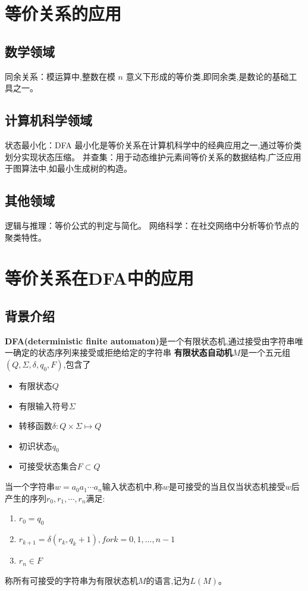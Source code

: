 \documentclass{article}
\begin{document}
\newpage
\section{等价关系的应用}
\subsection{数学领域}
同余关系：模运算中,整数在模 $n$ 意义下形成的等价类,即同余类,是数论的基础工具之一。

\subsection{计算机科学领域}
状态最小化：DFA 最小化是等价关系在计算机科学中的经典应用之一,通过等价类划分实现状态压缩。
并查集：用于动态维护元素间等价关系的数据结构,广泛应用于图算法中,如最小生成树的构造。

\subsection{其他领域}
逻辑与推理：等价公式的判定与简化。
网络科学：在社交网络中分析等价节点的聚类特性。


\newpage
\section{等价关系在DFA中的应用}
\subsection{背景介绍}
    \textbf{DFA(deterministic finite automaton)}是一个有限状态机,通过接受由字符串唯一确定的状态序列来接受或拒绝给定的字符串
    \textbf{有限状态自动机}$M$是一个五元组$(Q, \Sigma, \delta, q_0, F)$,包含了
    \begin{itemize}
        \item 有限状态$Q$
        \item 有限输入符号$\Sigma$
        \item 转移函数$\delta: Q \times \Sigma \mapsto Q$
        \item 初识状态$q_0$
        \item 可接受状态集合$F \subset Q$
    \end{itemize}
    当一个字符串$w = a_0a_1\cdots a_n$输入状态机中,称$w$是可接受的当且仅当状态机接受$w$后产生的序列$r_0, r_1, \cdots, r_n$满足:
    \begin{enumerate}
        \item $r_0 = q_0$
        \item $r_{k+1} = \delta(r_k, q_k+1), for k = 0, 1, \ldots, n-1$
        \item $r_n \in F$
    \end{enumerate}
    称所有可接受的字符串为有限状态机$M$的语言,记为$L(M)$。
    
\end{document}
